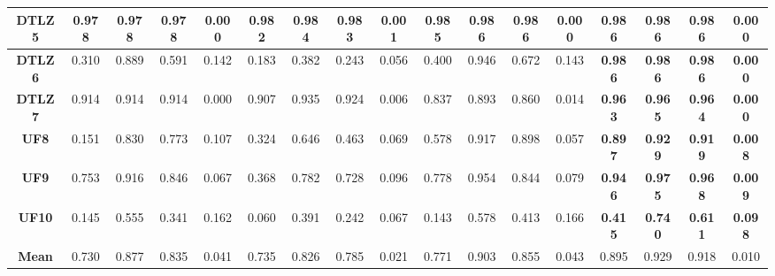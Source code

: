 \begin{table*}[t]
\begin{scriptsize}
\begin{tabular}{cc|c|c|c|c|c|c|c|c|c|c|c|c|c|c|c}
\multicolumn{1}{c|}{\textbf{DTLZ5}} & 0.978          & 0.978          & 0.978          & 0.000          & 0.982        & 0.984        & 0.983         & 0.001        & \textbf{0.985} & \textbf{0.986} & \textbf{0.986} & \textbf{0.000} & \textbf{0.986} & \textbf{0.986} & \textbf{0.986} & \textbf{0.000} \\ \hline
\multicolumn{1}{c|}{\textbf{DTLZ6}} & 0.310          & 0.889          & 0.591          & 0.142          & 0.183        & 0.382        & 0.243         & 0.056        & 0.400          & 0.946          & 0.672          & 0.143          & \textbf{0.986} & \textbf{0.986} & \textbf{0.986} & \textbf{0.000} \\ \hline
\multicolumn{1}{c|}{\textbf{DTLZ7}} & 0.914          & 0.914          & 0.914          & 0.000          & 0.907        & 0.935        & 0.924         & 0.006        & 0.837          & 0.893          & 0.860          & 0.014          & \textbf{0.963} & \textbf{0.965} & \textbf{0.964} & \textbf{0.000} \\ \hline
\multicolumn{1}{c|}{\textbf{UF8}}   & 0.151          & 0.830          & 0.773          & 0.107          & 0.324        & 0.646        & 0.463         & 0.069        & 0.578          & 0.917          & 0.898          & 0.057          & \textbf{0.897} & \textbf{0.929} & \textbf{0.919} & \textbf{0.008} \\ \hline
\multicolumn{1}{c|}{\textbf{UF9}}   & 0.753          & 0.916          & 0.846          & 0.067          & 0.368        & 0.782        & 0.728         & 0.096        & 0.778          & 0.954          & 0.844          & 0.079          & \textbf{0.946} & \textbf{0.975} & \textbf{0.968} & \textbf{0.009} \\ \hline
\multicolumn{1}{c|}{\textbf{UF10}}  & 0.145          & 0.555          & 0.341          & 0.162          & 0.060        & 0.391        & 0.242         & 0.067        & 0.143          & 0.578          & 0.413          & 0.166          & \textbf{0.415} & \textbf{0.740} & \textbf{0.611} & \textbf{0.098} \\ \hline
\multicolumn{1}{c|}{\textbf{Mean}}  & 0.730          & 0.877          & 0.835          & 0.041          & 0.735        & 0.826        & 0.785         & 0.021        & 0.771          & 0.903          & 0.855          & 0.043          & 0.895          & 0.929          & 0.918          & 0.010          \\ \hline
\end{tabular}%
\end{scriptsize}
\end{table*}




